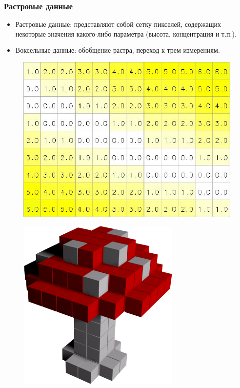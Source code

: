 \begin{frame}
\frametitle{Растровые данные}
\begin{itemize}
\item Растровые данные: представляют собой сетку пикселей, содержащих некоторые значения какого-либо параметра (высота, концентрация и т.п.).
\item Воксельные данные: обобщение растра, переход к трем измерениям.
\end{itemize}
\begin{multicols}{2}
\begin{figure}[!ht]
          \begin{center}
            \includegraphics[width=\columnwidth]{./grass/img/raster_model.png}
        \end{center}
\end{figure}
\begin{figure}[!ht]
          \begin{center}
            \includegraphics[width=0.7\columnwidth]{./grass/img/voxel_model.png}
        \end{center}
\end{figure}
\end{multicols}
\end{frame}

